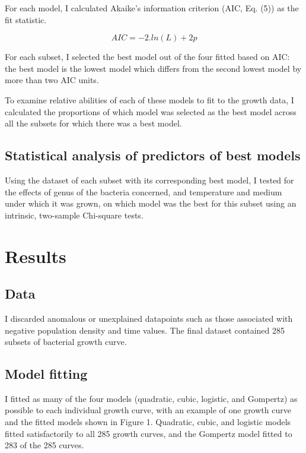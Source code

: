 \documentclass[11pt]{article}
\begin{document}
	For each model, I calculated Akaike's information criterion (AIC, Eq. (5)) as the fit statistic. 
	
	\begin{equation}
		AIC = -2.ln(L) + 2p
	\end{equation}
	
	For each subset, I selected the best model out of the four fitted based on AIC: the best model is the lowest model which differs from the second lowest model by more than two AIC units.
	
	To examine relative abilities of each of these models to fit to the growth data, I calculated the proportions of which model was selected as the best model across all the subsets for which there was a best model. 
	
	
	\subsection{Statistical analysis of predictors of best models}
	
	Using the dataset of each subset with its corresponding best model, I tested for the effects of genus of the bacteria concerned, and temperature and medium under which it was grown, on which model was the best for this subset using an intrinsic, two-sample Chi-square tests.
	
	
	
	\section{Results}
	
	\subsection{Data}
	
	I discarded anomalous or unexplained datapoints such as those associated with negative population density and time values. The final dataset contained 285 subsets of bacterial growth curve.
	
	
	\subsection{Model fitting}
	
	I fitted as many of the four models (quadratic, cubic, logistic, and Gompertz) as possible to each individual growth curve, with an example of one growth curve and the fitted models shown in Figure 1. Quadratic, cubic, and logistic models fitted satisfactorily to all 285 growth curves, and the Gompertz model fitted to 283 of the 285 curves.  
\end{document}
